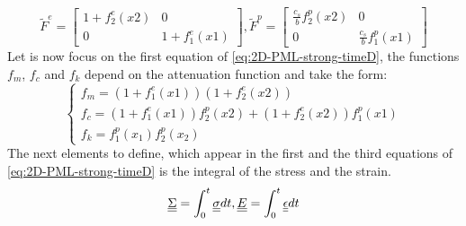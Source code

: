 \begin{equation}
\tilde{F}^e = \begin{bmatrix}
1+f^e_2(x2)&0\\0&1+f^e_1(x1)
\end{bmatrix}, \tilde{F}^p = \begin{bmatrix}
\frac{c_s}{b}f^p_2(x2)&0\\0&\frac{c_s}{b}f^p_1(x1) 
\end{bmatrix} 
\end{equation}
Let is now focus on the first equation of \ref{eq:2D-PML-strong-timeD}, the functions $f_m$, $f_c$ and $f_k$ depend on the attenuation function and take the form:
\begin{equation}
\begin{cases}
f_m = (1+f^e_1(x1))(1+f^e_2(x2))\\
f_c = (1+f^e_1(x1))f^p_2(x2) + (1+f^e_2(x2))f^p_1(x1)\\
f_k = f^p_1(x_1)f^p_2(x_2)
\end{cases}
\end{equation}
The next elements to define, which appear in the first and the third equations of \ref{eq:2D-PML-strong-timeD} is the integral of the stress and the strain.
\begin{equation}
\underline{\underline{\Sigma}} = \int^t_0 \underline{\underline{\sigma}} dt, \underline{\underline{E}} = \int^t_0 \underline{\underline{\epsilon}} dt
\end{equation} 
